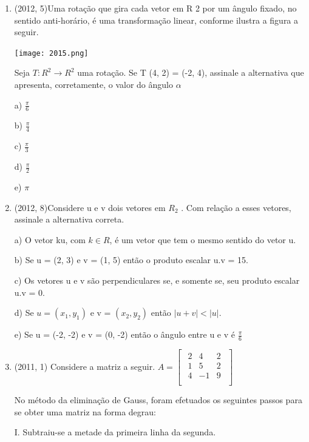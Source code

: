 \documentclass{article}
\begin{document}
\begin{enumerate}
\item(2012, 5)Uma rotação que gira cada vetor em R 2 por um ângulo fixado, no sentido anti-horário, é uma transformação linear, conforme ilustra a figura a seguir.


\texttt{[image: 2015.png]}\newline

Seja $T : R^2 \rightarrow R^2$ uma rotação. Se T (4, 2) = (-2, 4), assinale a alternativa que apresenta, corretamente, o valor do ângulo $\alpha$

a) $\frac{\pi}{6} $

b) $\frac{\pi}{4} $

c) $\frac{\pi}{3} $

d) $\frac{\pi}{2} $

e) $\pi $ \newline



\item(2012, 8)Considere u e v dois vetores em $R_2$ . Com relação a esses vetores, assinale a alternativa correta.

a) O vetor ku, com $k \in R$, é um vetor que tem o mesmo sentido do vetor u.

b) Se u = (2, 3) e v = (1, 5) então o produto escalar u.v = 15.

c) Os vetores u e v são perpendiculares se, e somente se, seu produto escalar u.v = 0.

d) Se $u = (x_1 , y_1 )$ e v = $(x_2 , y_2 )$ então $|u + v| < |u|$.

e) Se u = (-2, -2) e v = (0, -2) então o ângulo entre u e v é $\frac{\pi}{6}$\newline



\item(2011, 1) Considere a matriz a seguir.
$
A = \left [ \begin{matrix} 
    \begin{array}{ccc}
    2 & 4 & 2  \\
    1 & 5 & 2  \\
    4 & -1 & 9  \\
\end{array}
\end{matrix} \right ]$ \newline

No método da eliminação de Gauss, foram efetuados os seguintes passos para se obter uma matriz na
forma degrau:

I. Subtraiu-se a metade da primeira linha da segunda.


\end{enumerate}
\end{document}
